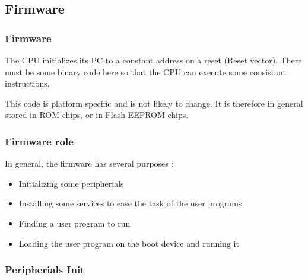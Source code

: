 \subsection{Firmware}

\begin{frame}
  \frametitle{Firmware}

  The CPU initializes its PC to a constant address on a reset (Reset vector). There must be some binary code here so that the CPU can execute some consistant instructions.

  \-

  This code is platform specific and is not likely to change. It is therefore in general stored in ROM chips, or in Flash EEPROM chips.

\end{frame}       

\begin{frame}
  \frametitle{Firmware role}

  In general, the firmware has several purposes :
  
  \-

  \begin{itemize}
  \item Initializing some peripherials
  \item Installing some services to ease the task of the user programs
  \item Finding a user program to run
  \item Loading the user program on the boot device and running it
  \end{itemize}

\end{frame}

\subsubsection{Peripherials Init}

